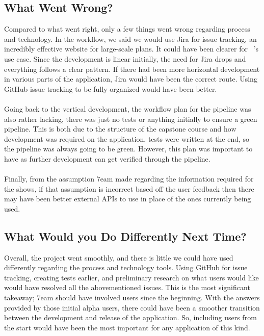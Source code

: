 \documentclass{article}
\begin{document}
\subsection{What Went Wrong?}

Compared to what went right, only a few things went wrong regarding process and technology. In the workflow, we said we would use Jira for issue tracking, an incredibly effective website for large-scale plans. It could have been clearer for \progname ~'s use case. Since the development is linear initially, the need for Jira drops and everything follows a clear pattern. If there had been more horizontal development in various parts of the application, Jira would have been the correct route. Using GitHub issue tracking to be fully organized would have been better.
\\~\\ Going back to the vertical development, the workflow plan for the pipeline was also rather lacking, there was just no tests or anything initially to ensure a green pipeline. This is both due to the structure of the capstone course and how development was required on the application, tests were written at the end, so the pipeline was always going to be green. However, this plan was important to have as further development can get verified through the pipeline.
\\~\\ Finally, from the assumption 7eam made regarding the information required for the shows, if that assumption is incorrect based off the user feedback then there may have been better external APIs to use in place of the ones currently being used.

\subsection{What Would you Do Differently Next Time?}

\noindent Overall, the project went smoothly, and there is little we could have used differently regarding the process and technology tools. Using GitHub for issue tracking, creating tests earlier, and preliminary research on what users would like would have resolved all the abovementioned issues. This is the most significant takeaway; 7eam should have involved users since the beginning. With the answers provided by those initial alpha users, there could have been a smoother transition between the development and release of the application. So, including users from the start would have been the most important for any application of this kind.
\end{document}
